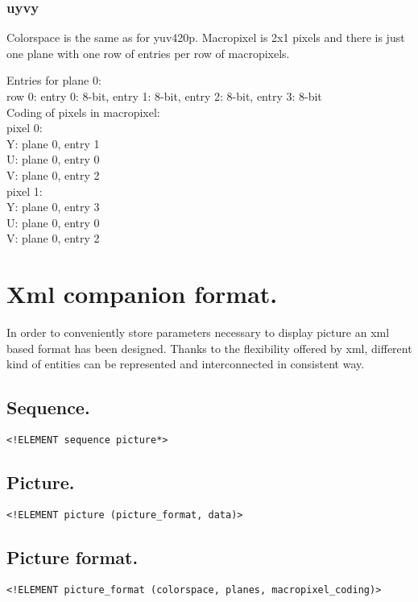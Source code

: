 \subsubsection{uyvy}

Colorspace is the same as for yuv420p. Macropixel is 2x1 pixels and there is just one plane with one row of entries per row of macropixels. 

Entries for plane 0: \\
row 0: entry 0: 8-bit, entry 1: 8-bit, entry 2: 8-bit, entry 3: 8-bit \\

Coding of pixels in macropixel: \\
pixel 0: \\
Y: plane 0, entry 1 \\
U: plane 0, entry 0 \\
V: plane 0, entry 2 \\
pixel 1: \\
Y: plane 0, entry 3 \\
U: plane 0, entry 0 \\
V: plane 0, entry 2 \\

\section{Xml companion format.}

In order to conveniently store parameters necessary to display picture an xml based format has been designed. Thanks to the flexibility offered by xml, different kind of entities can be represented and interconnected in consistent way.


\subsection{Sequence.}
\begin{verbatim}
<!ELEMENT sequence picture*>
\end{verbatim}

\subsection{Picture.}
\begin{verbatim}
<!ELEMENT picture (picture_format, data)>
\end{verbatim}

\subsection{Picture format.}
\begin{verbatim}
<!ELEMENT picture_format (colorspace, planes, macropixel_coding)>
\end{verbatim}


